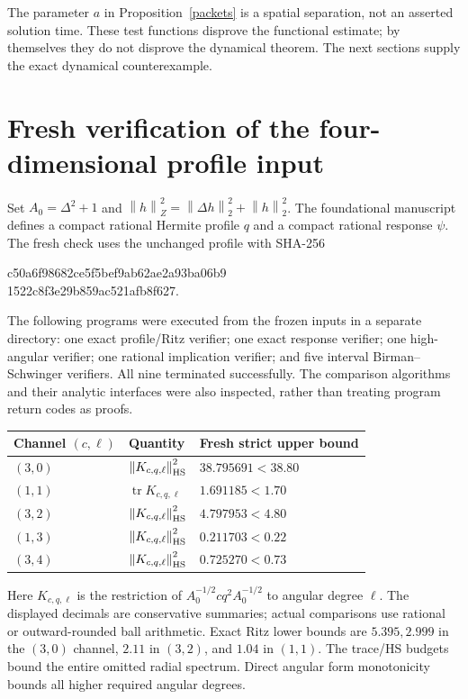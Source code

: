 \documentclass[11pt,a4paper]{article}
\newcommand{\norm}[1]{\left\|#1\right\|}
\begin{document}
The parameter $a$ in Proposition~\ref{packets} is a spatial separation, not an asserted solution time. These test functions disprove the functional estimate; by themselves they do not disprove the dynamical theorem. The next sections supply the exact dynamical counterexample.

\section{Fresh verification of the four-dimensional profile input}
Set $A_0=\Delta^2+1$ and $\norm h_Z^2=\norm{\Delta h}_2^2+\norm h_2^2$. The foundational manuscript \cite{Our} defines a compact rational Hermite profile $q$ and a compact rational response $\psi$. The fresh check uses the unchanged profile with SHA-256
\begin{center}\small\ttfamily
c50a6f98682ce5f5bef9ab62ae2a93ba06b9\\
1522c8f3e29b859ac521afb8f627.
\end{center}
The following programs were executed from the frozen inputs in a separate directory: one exact profile/Ritz verifier; one exact response verifier; one high-angular verifier; one rational implication verifier; and five interval Birman--Schwinger verifiers. All nine terminated successfully. The comparison algorithms and their analytic interfaces were also inspected, rather than treating program return codes as proofs.

\begin{center}\small
\begin{tabular}{@{}lll@{}}
\toprule
Channel $(c,\ell)$ & Quantity & Fresh strict upper bound\\\midrule
$(3,0)$ & $\norm{K_{c,q,\ell}}_{\rm HS}^2$ & $38.795691<38.80$\\
$(1,1)$ & $\operatorname{tr}K_{c,q,\ell}$ & $1.691185<1.70$\\
$(3,2)$ & $\norm{K_{c,q,\ell}}_{\rm HS}^2$ & $4.797953<4.80$\\
$(1,3)$ & $\norm{K_{c,q,\ell}}_{\rm HS}^2$ & $0.211703<0.22$\\
$(3,4)$ & $\norm{K_{c,q,\ell}}_{\rm HS}^2$ & $0.725270<0.73$\\\bottomrule
\end{tabular}
\end{center}
Here $K_{c,q,\ell}$ is the restriction of $A_0^{-1/2}cq^2A_0^{-1/2}$ to angular degree $\ell$. The displayed decimals are conservative summaries; actual comparisons use rational or outward-rounded ball arithmetic. Exact Ritz lower bounds are $5.395,2.999$ in the $(3,0)$ channel, $2.11$ in $(3,2)$, and $1.04$ in $(1,1)$. The trace/HS budgets bound the entire omitted radial spectrum. Direct angular form monotonicity bounds all higher required angular degrees.
\end{document}
